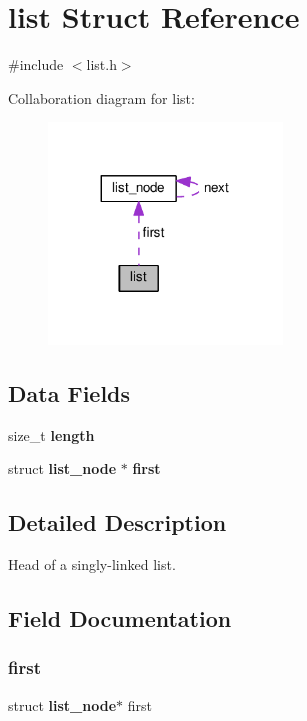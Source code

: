\section{list Struct Reference}
\label{structlist}


{\ttfamily \#include $<$list.\+h$>$}



Collaboration diagram for list\+:
\nopagebreak
\begin{figure}[H]
\begin{center}
\leavevmode
\includegraphics[width=176pt]{structlist__coll__graph}
\end{center}
\end{figure}
\subsection*{Data Fields}
\begin{DoxyCompactItemize}
\item 
size\+\_\+t \textbf{ length}
\item 
struct \textbf{ list\+\_\+node} $\ast$ \textbf{ first}
\end{DoxyCompactItemize}


\subsection{Detailed Description}
Head of a singly-\/linked list. 

\subsection{Field Documentation}
\mbox{\label{structlist_a15417ebe69a6b33324e8286dde558146}} 
\subsubsection{first}
{\footnotesize\ttfamily struct \textbf{ list\+\_\+node}$\ast$ first}

